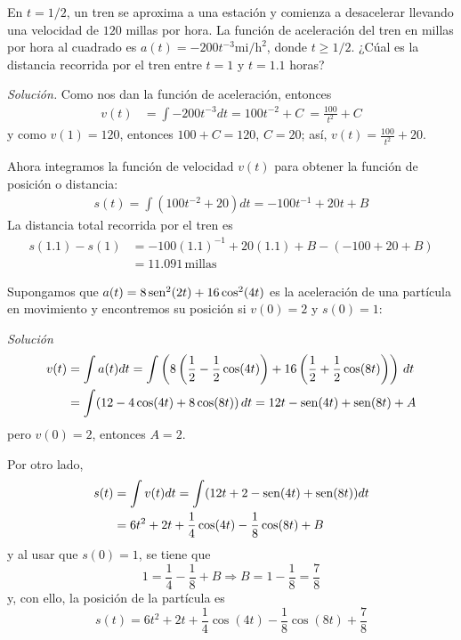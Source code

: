 \begin{ejemplo}
  En $t=1/2$, un tren se aproxima a una estación y comienza a desacelerar llevando una velocidad de $120$ millas por hora. La función de aceleración del tren en millas por hora al cuadrado es $a(t) =-200 t ^{-3}\text{mi}/\text{h}^{2}$, donde $t\geq 1/2.$ ¿Cúal es la distancia recorrida por el tren entre $t=1$ y $t=1.1$ horas?
\end{ejemplo}

\emph{Solución.} Como nos dan la función de aceleración, entonces
\begin{align*}
  v(t) &=\int -200 t^{-3}dt%
  =100t^{-2}+C \
  =\frac{100}{t^{2}}+C
\end{align*}
y como $v\left( 1\right) =120$, entonces $100+C=120$, $C=20$; así, $v(t)=\frac{100}{t ^{2}}+20$.

Ahora integramos la función de velocidad $v(t) $ para obtener la función de posición o distancia:
\begin{align*}
  s(t) =\int \left( 100t^{-2}+20\right)
  dt=-100t^{-1}+20t+B
\end{align*}
La distancia total recorrida por el tren es
\begin{align*}
  s\left( 1.1\right) -s\left( 1\right) &=-100\left( 1.1\right) ^{-1}+20\left(
  1.1\right) +B-\left( -100+20+B\right) \\
  &=11.091\, \text{millas}
\end{align*}

\begin{ejemplo}
  Supongamos que $a(t)=8\operatorname{sen} ^{2}(2t)+16\cos ^{2}(4t)$ es la aceleración de una partícula en movimiento y encontremos su posición si $v(0)=2$ y $s(0)=1$:
\end{ejemplo}

\emph{Solución}
\begin{align*}
  v(t)&=\int a(t)dt=\int \left( 8\left(\frac{1}{2}-\frac{1}{2}\cos(4t)\right)+16\left(\frac{1}{2}+%
  \frac{1}{2}\cos (8t)\right) \right) \,dt\\
  &=\int (12-4\cos (4t)+8\cos (8t))\,dt=12t-\sen (4t)+\sen (8t)+A
\end{align*}
pero $v(0)=2$, entonces $A=2$.

Por otro lado,
\begin{align*}
  s(t)&=\int v(t)dt=\int (12t+2-\operatorname{sen} (4t)+\operatorname{sen} (8t))dt\\
  &=6t^2+2t+\frac{1}{4}\cos(4t)-\frac{1}{8}\cos(8t)+B
\end{align*}
y al usar que $s(0)=1$, se tiene que
\[
  1=\frac{1}{4}-\frac{1}{8}+B \Rightarrow B=1-\frac{1}{8}=\frac{7}{8}
\]
y, con ello, la posición de la partícula es
\[
  s(t)=6t^{2}+2t+\frac{1}{4}\cos (4t)-\frac{1}{8}\cos (8t)+\frac{7}{8}
\]

